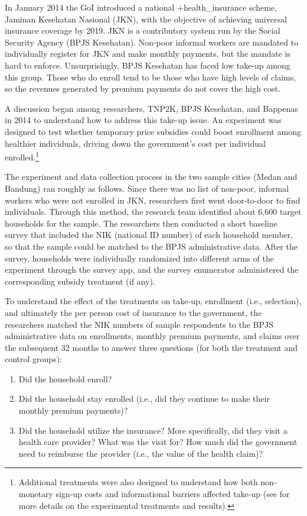 \documentclass[
]{book}
\providecommand{\tightlist}{%
  \setlength{\itemsep}{0pt}\setlength{\parskip}{0pt}}
\begin{document}
In January 2014 the GoI introduced a national +health\_insurance\textbar{} scheme, Jaminan Kesehatan Nasional (JKN), with the objective of achieving universal insurance coverage by 2019. JKN is a contributory system run by the Social Security Agency (BPJS Kesehatan). Non-poor informal workers are mandated to individually register for JKN and make monthly payments, but the mandate is hard to enforce. Unsurprisingly, BPJS Kesehatan has faced low take-up among this group. Those who do enroll tend to be those who have high levels of claims, so the revenues generated by premium payments do not cover the high cost.

A discussion began among researchers, TNP2K, BPJS Kesehatan, and Bappenas in 2014 to understand how to address this take-up issue. An experiment was designed to test whether temporary price subsidies could boost enrollment among healthier individuals, driving down the government's cost per individual enrolled.\footnote{Additional treatments were also designed to understand how both non-monetary sign-up costs and informational barriers affected take-up (see \citet{banerjee2019} for more details on the experimental treatments and results).}

The experiment and data collection process in the two sample cities (Medan and Bandung) ran roughly as follows. Since there was no list of non-poor, informal workers who were not enrolled in JKN, researchers first went door-to-door to find individuals. Through this method, the research team identified about 6,600 target households for the sample. The researchers then conducted a short baseline survey that included the NIK (national ID number) of each household member, so that the sample could be matched to the BPJS administrative data. After the survey, households were individually randomized into different arms of the experiment through the survey app, and the survey enumerator administered the corresponding subsidy treatment (if any).

To understand the effect of the treatments on take-up, enrollment (i.e., selection), and ultimately the per person cost of insurance to the government, the researchers matched the NIK numbers of sample respondents to the BPJS administrative data on enrollments, monthly premium payments, and claims over the subsequent 32 months to answer three questions (for both the treatment and control groups):

\begin{enumerate}
\def\labelenumi{\arabic{enumi})}
\tightlist
\item
  Did the household enroll?
\item
  Did the household stay enrolled (i.e., did they continue to make their monthly premium payments)?
\item
  Did the household utilize the insurance? More specifically, did they visit a health care provider? What was the visit for? How much did the government need to reimburse the provider (i.e., the value of the health claim)?
\end{enumerate}
\end{document}

